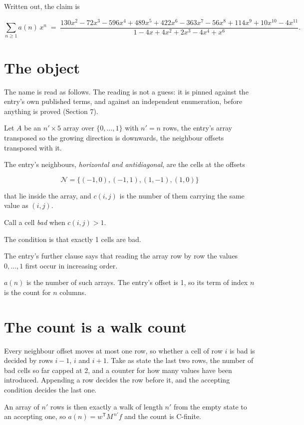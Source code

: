 \documentclass[11pt]{article}
\theoremstyle{definition}
\begin{document}
Written out, the claim is

\[\sum_{n \ge 1} a(n)\,x^n \;=\; \frac{130x^{2} - 72x^{3} - 596x^{4} + 489x^{5} + 422x^{6} - 363x^{7} - 56x^{8} + 114x^{9} + 10x^{10} - 4x^{11}}{1 - 4x + 4x^{2} + 2x^{3} - 4x^{4} + x^{6}}.\]

\section{The object}

The name is read as follows. The reading is not a guess: it is pinned against the entry's own published terms, and against an independent enumeration, before anything is proved (Section 7).

Let $A$ be an $n' \times 5$ array over $\{0,\dots,1\}$ with $n' = n$ rows, the entry's array transposed so the growing direction is downwards, the neighbour offsets transposed with it.

The entry's neighbours, {\itshape horizontal and antidiagonal}, are the cells at the offsets

\[\mathcal{N} = \{(-1,0), (-1,1), (1,-1), (1,0)\}\]

that lie inside the array, and $c(i,j)$ is the number of them carrying the same value as $(i,j)$.

Call a cell {\itshape bad} when $c(i,j) > 1$.

The condition is that exactly 1 cells are bad.

The entry's further clause says that reading the array row by row the values $0,\dots,1$ first occur in increasing order.

$a(n)$ is the number of such arrays. The entry's offset is 1, so its term of index $n$ is the count for $n$ columns.

\section{The count is a walk count}

Every neighbour offset moves at most one row, so whether a cell of row $i$ is bad is decided by rows $i-1$, $i$ and $i+1$. Take as state the last two rows, the number of bad cells so far capped at 2, and a counter for how many values have been introduced. Appending a row decides the row before it, and the accepting condition decides the last one.

An array of $n'$ rows is then exactly a walk of length $n'$ from the empty state to an accepting one, so $a(n) = w^{\mathsf T}M^{\,n'}f$ and the count is C-finite.
\end{document}
